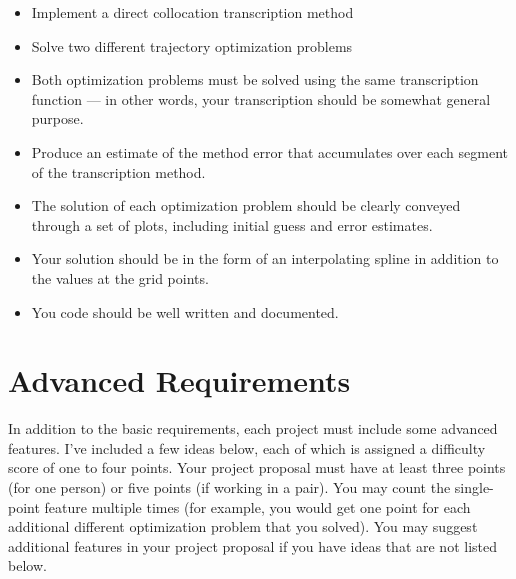 \vspace{-0.0em} \begin{itemize}  \setlength\itemsep{0em} \setlength\itemindent{18pt}

  \item Implement a direct collocation transcription method

  \item Solve two different trajectory optimization problems

  \item Both optimization problems must be solved using the same transcription function ---
        in other words, your transcription should be somewhat general purpose.

  \item Produce an estimate of the method error that accumulates over each segment
        of the transcription method.

  \item The solution of each optimization problem should be clearly conveyed
        through a set of plots, including initial guess and error estimates.

  \item Your solution should be in the form of an interpolating spline in
        addition to the values at the grid points.

  \item You code should be well written and documented.

\end{itemize}



\section*{Advanced Requirements}

In addition to the basic requirements, each project must include some advanced
features. I've included a few ideas below, each of which is assigned a
difficulty score of one to four points. Your project proposal must have at
least three points (for one person) or five points (if working in a pair).
You may count the single-point feature multiple times
(for example, you would get one point for
each additional different optimization problem that you solved).
You may suggest additional features in your project proposal if you have ideas
that are not listed below.

